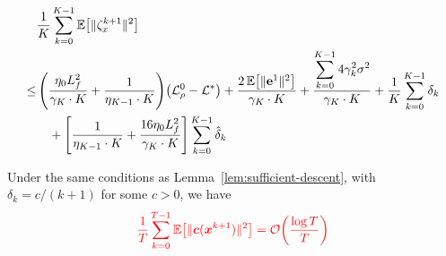 \documentclass[10pt]{article}
\begin{document}
\begin{lemma}
\begin{align}
&\frac{1}{K}\sum_{k=0}^{K-1}\mathbb{E}\!\left[\|\zeta_x^{k+1}\|^2\right] \notag \\
\leq &
\left(\frac{\eta_0 L_f^2}{\gamma_K \cdot K} + \frac{1}{\eta_{K-1} \cdot K}\right)
\!\bigl(\mathcal{L}_\rho^0 - \mathcal{L}^*\bigr)
+ \frac{2\,\mathbb{E}\!\left[\|\mathbf{e}^1\|^2\right]}{\gamma_K \cdot K}
+ \frac{\displaystyle\sum_{k=0}^{K-1} 4\gamma_k^2\sigma^2}{\gamma_K \cdot K}
+ \frac{1}{K}\sum_{k=0}^{K-1}\delta_k \notag \\
&\quad
+ \left[\frac{1}{\eta_{K-1} \cdot K} + \frac{16\eta_0 L_f^2}{\gamma_K \cdot K}\right]
\sum_{k=0}^{K-1}\hat{\delta}_k
\end{align}
    
\end{lemma}
\begin{lemma}\label{lem:feasibility}
Under the same conditions as Lemma~\ref{lem:sufficient-descent},
with $\delta_k = c/(k+1)$ for some $c > 0$, we have
\begin{equation}\label{eq:feasibility-rate}
  \textcolor{red}{%
    \frac{1}{T}\sum_{k=0}^{T-1}\mathbb{E}\!\left[\|\bc(\bx^{k+1})\|^2\right]
    = \mathcal{O}\!\left(\frac{\log T}{T}\right)
  }
\end{equation}
\end{lemma}
\end{document}
